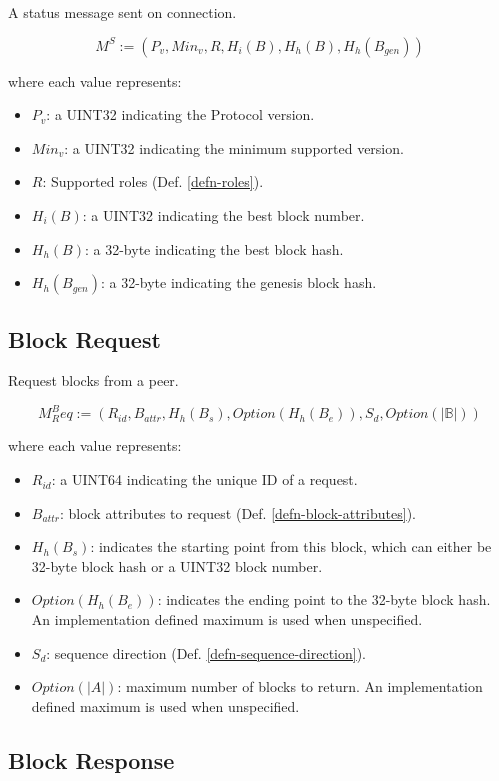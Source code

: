 \documentclass{book}
\begin{document}
A status message sent on connection.

\[
    M^S := (P_v, Min_v, R, H_i(B), H_h(B), H_h(B_{gen}))
\]

where each value represents:

\begin{itemize}
    \item $P_v$: a UINT32 indicating the Protocol version.
    \item $Min_v$: a UINT32 indicating the minimum supported version.
    \item $R$: Supported roles (Def. \ref{defn-roles}).
    \item $H_i(B)$: a UINT32 indicating the best block number.
    \item $H_h(B)$: a 32-byte indicating the best block hash.
    \item $H_h(B_{gen})$: a 32-byte indicating the genesis block hash.
\end{itemize}

\subsection{Block Request}\label{sect-block-request}

Request blocks from a peer.

\[
    M^B_Req := (R_{id}, B_{attr}, H_h(B_s), Option(H_h(B_e)), S_d, Option(|\mathbb{B}|))
\]

where each value represents:

\begin{itemize}
    \item $R_{id}$: a UINT64 indicating the unique ID of a request.
    \item $B_{attr}$: block attributes to request (Def.
    \ref{defn-block-attributes}).
    \item $H_h(B_s)$: indicates the starting point from this block, which can either
    be 32-byte block hash or a UINT32 block number.
    \item $Option(H_h(B_e))$: indicates the ending point to the 32-byte block
    hash. An implementation defined maximum is used when unspecified.
    \item $S_d$: sequence direction (Def. \ref{defn-sequence-direction}). 
    \item $Option(|A|)$: maximum number of blocks to return. An
    implementation defined maximum is used when unspecified.
\end{itemize}

\subsection{Block Response}
\end{document}
